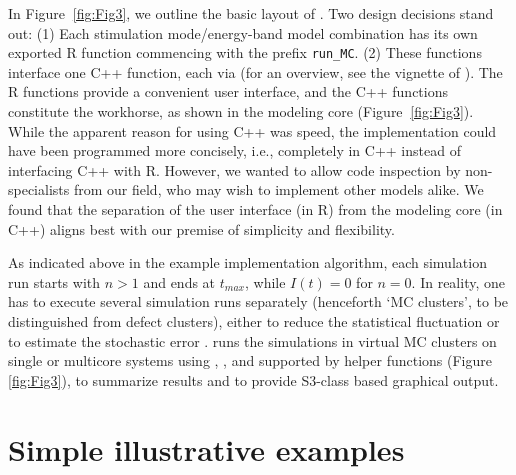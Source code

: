 In Figure\(~\) \ref{fig:Fig3}, we outline the basic layout of
. Two design decisions stand out: (1) Each
stimulation mode/energy-band model combination has its own exported R
function commencing with the prefix \texttt{run\_MC}. (2) These
functions interface one C++ function, each via 
\citep{Rcpp} (for an overview, see the vignette of ).
The R functions provide a convenient user interface, and the C++
functions constitute the workhorse, as shown in the modeling core
(Figure\(~\) \ref{fig:Fig3}). While the apparent reason for using C++
was speed, the implementation could have been programmed more concisely,
i.e., completely in C++ instead of interfacing C++ with R. However, we
wanted to allow code inspection by non-specialists from our field, who
may wish to implement other models alike. We found that the separation
of the user interface (in R) from the modeling core (in C++) aligns
best with our premise of simplicity and flexibility.

As indicated above in the example implementation algorithm, each
simulation run \citep[ used the term `particle
tracking']{Kulkarni:1994dr} starts with \(n > 1\) and ends at
\(t_{max}\), while \(I(t) = 0\) for \(n = 0\). In reality, one has to
execute several simulation runs separately (henceforth `MC clusters', to
be distinguished from defect clusters), either to reduce the statistical
fluctuation or to estimate the stochastic error \citep{Kulkarni:1994dr}.
 runs the simulations in virtual MC clusters on
single or multicore systems using  \citep{parallel},
 \citep{doParallel}, and 
\citep{foreach} supported by helper functions (Figure\(~\)
\ref{fig:Fig3}), to summarize results and to provide S3-class based
graphical output.

\hypertarget{simple-illustrative-examples}{%
\section{Simple illustrative
examples}\label{simple-illustrative-examples}}


